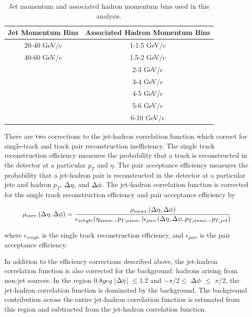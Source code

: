 \begin{table}
    \centering
    \begin{tabular}{|c||c|}
        \hline
        Jet Momentum Bins & Associated Hadron Momentum Bins \\
        \hline
        20-40 GeV/c & 1-1.5 GeV/c \\
        40-60 GeV/c & 1.5-2 GeV/c \\
        & 2-3 GeV/c \\
        & 3-4 GeV/c \\
        & 4-5 GeV/c \\
        & 5-6 GeV/c \\
        & 6-10 GeV/c \\
        \hline
    \end{tabular}
    \caption{Jet momentum and associated hadron momentum bins used in this analysis.}\label{tab:jetHadronBins}
\end{table}

There are two corrections to the jet-hadron correlation function which correct for single-track and track pair reconstruction inefficiency. The single track reconstruction efficiency measures the probability that a track is reconstructed in the detector at a particular $p_T$ and $\eta$. The pair acceptance efficiency measures the probability that a jet-hadron pair is reconstructed in the detector at a particular jets and hadron $p_T$, $\Delta \eta$, and $\Delta \phi$.  The jet-hadron correlation function is corrected for the single track reconstruction efficiency and pair acceptance efficiency by

\begin{equation}
    \rho_{corr.}(\Delta \eta, \Delta \phi) = \frac{\rho_{meas.}(\Delta \eta, \Delta \phi)}{\epsilon_{single}(\eta_{assoc.}, p_{T,assoc.}) \epsilon_{pair}(\Delta \eta, \Delta \phi, p_{T,assoc.}, p_{T,jet})}
\end{equation}

\noindent where $\epsilon_{single}$ is the single track reconstruction efficiency, and $\epsilon_{pair}$ is the pair acceptance efficiency.

In addition to the efficiency corrections described above, the jet-hadron correlation function is also corrected for the background: hadrons arising from non-jet sources. In the region 0.8$geq$ |$\Delta \eta$| $\leq$1.2 and $-\pi$/2$\leq$ $\Delta \phi$ $\leq$ $\pi$/2, the jet-hadron correlation function is dominated by the background. The background contribution across the entire jet-hadron correlation function is estimated from this region and subtracted from the jet-hadron correlation function. 

